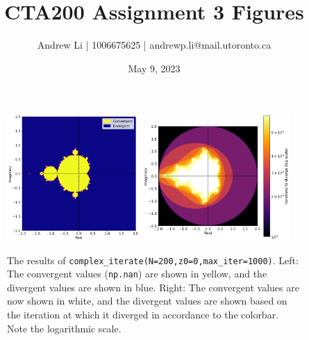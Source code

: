 \documentclass{article}
\title{CTA200 Assignment 3 Figures}
\author{Andrew Li | 1006675625 | andrewp.li@mail.utoronto.ca}
\date{May 9, 2023}
\begin{document}
\maketitle

\begin{figure}[H]
\begin{center}
    \includegraphics[width=0.45\textwidth]{figures/mandelbrot 1.png}
    \includegraphics[width=0.5\textwidth]{figures/mandelbrot 2.png}
\end{center}
\vspace{-2em}
    \caption{The results of \texttt{complex\_iterate(N=200,z0=0,max\_iter=1000)}. Left: The convergent values (\texttt{np.nan}) are shown in yellow, and the divergent values are shown in blue. Right: The convergent values are now shown in white, and the divergent values are shown based on the iteration at which it diverged in accordance to the colorbar. Note the logarithmic scale.}
    \label{fig:1}
\end{figure}
\end{document}
